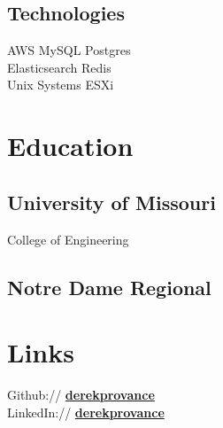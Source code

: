 \documentclass[]{resume}
\begin{document}
\begin{minipage}[t]{0.33\textwidth}
\subsection{Technologies}
AWS \textbullet{} MySQL \textbullet{}  Postgres \\
Elasticsearch \textbullet{}  Redis \\
Unix Systems \textbullet{}  ESXi
\sectionsep


\section{Education}

\subsection{University of Missouri}
College of Engineering \\
\sectionsep

\subsection{Notre Dame Regional}
\sectionsep


\section{Links}
Github:// \href{https://github.com/derekprovance}{\bf derekprovance} \\
LinkedIn://  \href{https://www.linkedin.com/in/derekprovance}{\bf derekprovance} \\

%
%

\end{minipage}
\hfill
\end{document}
